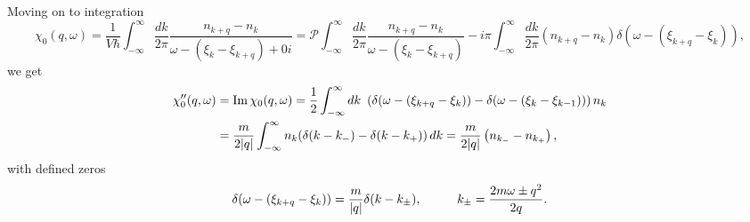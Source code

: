 Moving on to integration
\begin{equation*}
	\chi_0 (q,\omega) = \frac{1}{V \hbar} \int_{-\infty}^{\infty} \frac{dk}{2\pi} \frac{n_{k+q} - n_k}{\omega- (\xi_k - \xi_{k+q}) + 0 i} = \mathcal{P} \int_{-\infty}^{\infty} \frac{dk}{2\pi} \frac{n_{k+q} - n_k}{\omega- (\xi_k - \xi_{k+q})} - i \pi \int_{-\infty}^{\infty} \frac{dk}{2\pi} 
	\left(n_{k+q} - n_k\right) \delta(\omega - (\xi_{k+q}-\xi_k)),
\end{equation*}
we get
\begin{align*}
	\chi_0''(q,\omega) &= \mathop{\mathrm{Im}}\nolimits \chi_0 (q, \omega) = \frac{1}{2} \int_{-\infty}^{\infty} dk\ \left(
		\delta(\omega - (\xi_{k+q}-\xi_k)) - \delta(\omega - (\xi_k - \xi_{k-1}))
	\right) n_k 
	\\ &= 
	\frac{m}{2|q|} \int_{-\infty}^{\infty} n_k (\delta(k-k_-) - \delta(k - k_+)) \, d k = \frac{m}{2|q|} \left(
		n_{k_-} - n_{k_+}
	\right)
	,
\end{align*}
with defined zeros 
\begin{equation*}
	\delta(\omega - (\xi_{k+q} - \xi_k)) = \frac{m}{|q|} \delta(k - k_\pm),
	\hspace{10 mm} 
	k_{\pm} = \frac{2 m \omega \pm q^2}{2q}.
\end{equation*}
